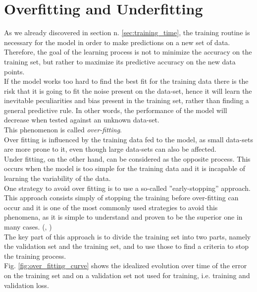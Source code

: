 



\section{Overfitting and Underfitting }\label{sec:of_uf}
As we already discovered in section n. \ref{sec:training_time}, the training routine is necessary for the model in order to make predictions on a new set of data. Therefore, the goal of the learning process is not to minimize the accuracy on the training set, but rather to maximize its predictive accuracy on the new data points. \citep{dietterich1995overfitting}\\
If the model works too hard to find the best fit for the training data there is the risk that it is going to fit the noise present on the data-set, hence it will learn the inevitable peculiarities and bias present in the training set, rather than finding a general predictive rule. In other words, the performance of the model will decrease when tested against an unknown data-set. \cite{jabbar2015methods}\\ This phenomenon is called \textit{over-fitting}. \citep{dietterich1995overfitting}\\
Over fitting is influenced by the training data fed to the model, as small data-sets are more prone to it, even though large data-sets can also be affected. \cite{10.1016/j.inffus.2008.11.003}\\
Under fitting, on the other hand, can be considered as the opposite process. This occurs when the model is too simple for the training data and it is incapable of learning the variability of the data. \cite{10.1016/j.inffus.2008.11.003}\\

One strategy to avoid over fitting is to use a so-called ''early-stopping'' approach. This approach consists simply of stopping the training before over-fitting can occur and it is one of the most commonly used strategies to avoid this phenomena, as it is simple to understand and proven to be the superior one in many cases. (\citep{FINNOFF1993771},  \cite{early_stopping}) \\
The key part of this approach is to divide the training set into two parts, namely the validation set and the training set, and to use those to find a criteria to stop the training process. \\
Fig. \ref{fig:over_fitting_curve} shows the idealized evolution over time of the error on the training set and on a validation set not used for training, i.e. training and validation loss. \cite{early_stopping}

